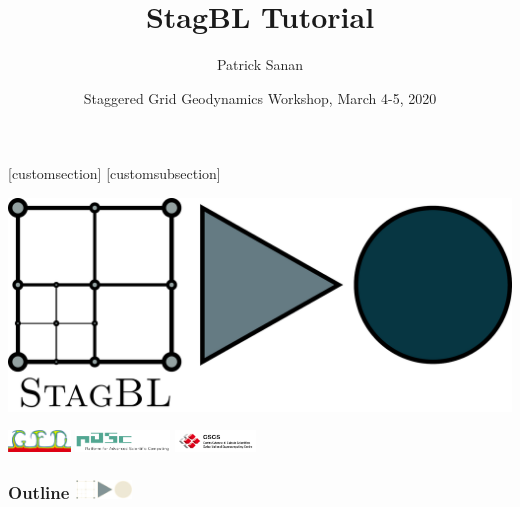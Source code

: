 \documentclass{beamer}
\author[Patrick Sanan]{Patrick Sanan}
\institute[]{ETH Zurich}
\title{StagBL Tutorial}
\date[2020.03.04]{Staggered Grid Geodynamics Workshop, March 4-5, 2020}
\newcommand\frametitlelogo[1]{\frametitle{#1\hspace{0pt plus 1 filll} \includegraphics[width=42pt]{logo_slides}}}
\begin{document}
[customsection]
[customsubsection]

\begin{frame}[fragile]
\titlepage
\begin{center}
\includegraphics[height=0.125\textheight]{logo}
\end{center}
\begin{center}
\includegraphics[height=1.6em]{GFD_t}
\hspace{2pt}
\hspace{4pt}
\includegraphics[height=1.6em]{pasc_avec}
\hspace{2pt}
\includegraphics[height=1.6em]{CSCS_RGB}
\end{center}
\end{frame}

\begin{frame}[fragile]
\frametitlelogo{Outline}
\tableofcontents
\end{frame}

\end{document}
